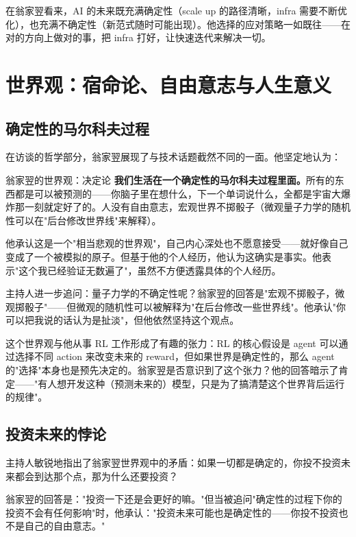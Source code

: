 \documentclass[a4paper]{article}
\begin{document}
在翁家翌看来，AI 的未来既充满确定性（scale up 的路径清晰，infra 需要不断优化），也充满不确定性（新范式随时可能出现）。他选择的应对策略一如既往——在对的方向上做对的事，把 infra 打好，让快速迭代来解决一切。


\section{世界观：宿命论、自由意志与人生意义}

\subsection{确定性的马尔科夫过程}

在访谈的哲学部分，翁家翌展现了与技术话题截然不同的一面。他坚定地认为：

\begin{importantbox}{翁家翌的世界观：决定论}
\textbf{我们生活在一个确定性的马尔科夫过程里面。}所有的东西都是可以被预测的——你脑子里在想什么，下一个单词说什么，全都是宇宙大爆炸那一刻就定好了的。人没有自由意志，宏观世界不掷骰子（微观量子力学的随机性可以在"后台修改世界线"来解释）。
\end{importantbox}

他承认这是一个"相当悲观的世界观"，自己内心深处也不愿意接受——就好像自己变成了一个被模拟的原子。但基于他的个人经历，他认为这确实是事实。他表示"这个我已经验证无数遍了"，虽然不方便透露具体的个人经历。

主持人进一步追问：量子力学的不确定性呢？翁家翌的回答是"宏观不掷骰子，微观掷骰子"——但微观的随机性可以被解释为"在后台修改一些世界线"。他承认"你可以把我说的话认为是扯淡"，但他依然坚持这个观点。

这个世界观与他从事 RL 工作形成了有趣的张力：RL 的核心假设是 agent 可以通过选择不同 action 来改变未来的 reward，但如果世界是确定性的，那么 agent 的"选择"本身也是预先决定的。翁家翌是否意识到了这个张力？他的回答暗示了肯定——"有人想开发这种（预测未来的）模型，只是为了搞清楚这个世界背后运行的规律"。

\subsection{投资未来的悖论}

主持人敏锐地指出了翁家翌世界观中的矛盾：如果一切都是确定的，你投不投资未来都会到达那个点，那为什么还要投资？

翁家翌的回答是："投资一下还是会更好的嘛。"但当被追问"确定性的过程下你的投资不会有任何影响"时，他承认："投资未来可能也是确定性的——你投不投资也不是自己的自由意志。"
\end{document}
